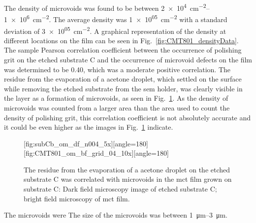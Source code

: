 The density of microvoids was found to be between \SIrange{2e+4}{1e+6}{\centi\metre^{-2}}. The average density was \SI{1e+05}{\centi\metre^{-2}} with a standard deviation of \SI{3e+05}{\centi\metre^{-2}}. A graphical representation of the density at different locations on the film can be seen in Fig.~\ref{fig:CMT801_densityData}. The sample Pearson correlation coefficient between the occurrence of polishing grit on the etched substrate C and the occurrence of microvoid defects on the film was determined to be \SI{0.40}{}, which was a moderate positive correlation. The residue from the evaporation of a acetone droplet, which settled on the surface while removing the etched substrate from the \ac{sem} holder, was clearly visible in the layer as a formation of microvoids, as seen in Fig.~\ref{fig:subCc_microvoids_correlation}. As the density of microvoids was counted from a larger area than the area used to count the density of polishing grit, this correlation coefficient is not absolutely accurate and it could be even higher as the images in Fig.~\ref{fig:subCc_microvoids_correlation} indicate.

\begin{figure}[htbp]
    \centering
    [fig:subCb_om_df_n004_5x][angle=180]
    \hfill
    [fig:CMT801_om_bf_grid_04_10x][angle=180]
    \caption[Residue on etched substrate C visible as microvoids in the film.]{The residue from the evaporation of a acetone droplet on the etched substrate C was correlated with microvoids in the \ac{mct} film grown on substrate C:  Dark field microscopy image of etched substrate C;  bright field microscopy of \ac{mct} film.}\label{fig:subCc_microvoids_correlation}
\end{figure}

The microvoids were The size of the microvoids was between \SIrange{1}{3}{\micro\metre}.

